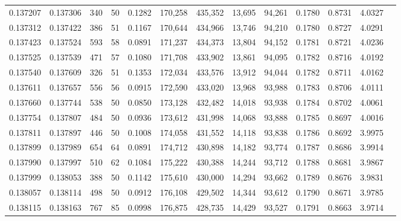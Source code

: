 \begin{tabular}{rrrrrrrrrrrrr}
0.137207 & 0.137306 &   340 &  50 &                                     0.1282 & 170,258 & 435,352 &  13,695 &  94,261 & 0.1780 & 0.8731 & 4.0327 \\
0.137312 & 0.137422 &   386 &  51 &                                     0.1167 & 170,644 & 434,966 &  13,746 &  94,210 & 0.1780 & 0.8727 & 4.0291 \\
0.137423 & 0.137524 &   593 &  58 &                                     0.0891 & 171,237 & 434,373 &  13,804 &  94,152 & 0.1781 & 0.8721 & 4.0236 \\
0.137525 & 0.137539 &   471 &  57 &                                     0.1080 & 171,708 & 433,902 &  13,861 &  94,095 & 0.1782 & 0.8716 & 4.0192 \\
0.137540 & 0.137609 &   326 &  51 &                                     0.1353 & 172,034 & 433,576 &  13,912 &  94,044 & 0.1782 & 0.8711 & 4.0162 \\
0.137611 & 0.137657 &   556 &  56 &                                     0.0915 & 172,590 & 433,020 &  13,968 &  93,988 & 0.1783 & 0.8706 & 4.0111 \\
0.137660 & 0.137744 &   538 &  50 &                                     0.0850 & 173,128 & 432,482 &  14,018 &  93,938 & 0.1784 & 0.8702 & 4.0061 \\
0.137754 & 0.137807 &   484 &  50 &                                     0.0936 & 173,612 & 431,998 &  14,068 &  93,888 & 0.1785 & 0.8697 & 4.0016 \\
0.137811 & 0.137897 &   446 &  50 &                                     0.1008 & 174,058 & 431,552 &  14,118 &  93,838 & 0.1786 & 0.8692 & 3.9975 \\
0.137899 & 0.137989 &   654 &  64 &                                     0.0891 & 174,712 & 430,898 &  14,182 &  93,774 & 0.1787 & 0.8686 & 3.9914 \\
0.137990 & 0.137997 &   510 &  62 &                                     0.1084 & 175,222 & 430,388 &  14,244 &  93,712 & 0.1788 & 0.8681 & 3.9867 \\
0.137999 & 0.138053 &   388 &  50 &                                     0.1142 & 175,610 & 430,000 &  14,294 &  93,662 & 0.1789 & 0.8676 & 3.9831 \\
0.138057 & 0.138114 &   498 &  50 &                                     0.0912 & 176,108 & 429,502 &  14,344 &  93,612 & 0.1790 & 0.8671 & 3.9785 \\
0.138115 & 0.138163 &   767 &  85 &                                     0.0998 & 176,875 & 428,735 &  14,429 &  93,527 & 0.1791 & 0.8663 & 3.9714 \\

\end{tabular}
